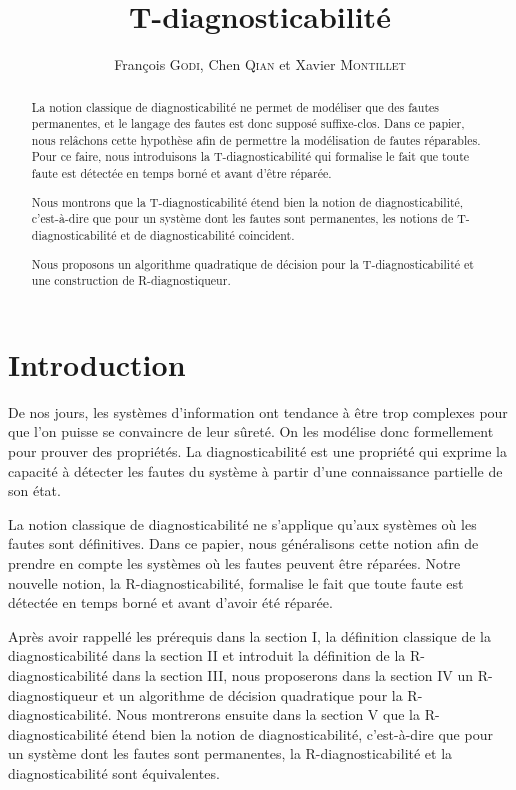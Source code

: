 \documentclass[10pt,a4paper]{article}
\author{Fran\c{c}ois \textsc{Godi}, Chen \textsc{Qian} et Xavier \textsc{Montillet}}
\title{T-diagnosticabilit\'e}
\begin{document}
\maketitle

\begin{abstract}
La notion classique de diagnosticabilit\'e ne permet de mod\'eliser que des fautes permanentes, et le langage des fautes est donc suppos\'e suffixe-clos. Dans ce papier, nous rel\^achons cette hypoth\`ese afin de permettre la mod\'elisation de fautes r\'eparables. Pour ce faire, nous introduisons la T-diagnosticabilit\'e qui formalise le fait que toute faute est d\'etect\'ee en temps born\'e et avant d'\^etre r\'epar\'ee.

Nous montrons que la T-diagnosticabilit\'e \'etend bien la notion de diagnosticabilit\'e, c'est-\`a-dire que pour un syst\`eme dont les fautes sont permanentes, les notions de T-diagnosticabilit\'e et de diagnosticabilit\'e coincident.

Nous proposons un algorithme quadratique de d\'ecision pour la T-diagnosticabilit\'e et une construction de R-diagnostiqueur.
\end{abstract}

\section{Introduction}

De nos jours, les syst\`emes d'information ont tendance \`a \^etre trop complexes pour que l'on puisse se convaincre de leur sûret\'e. On les mod\'elise donc formellement pour prouver des propriétés. La diagnosticabilit\'e est une propri\'et\'e qui exprime la capacit\'e \`a d\'etecter les fautes du syst\`eme \`a partir d'une connaissance partielle de son \'etat.

La notion classique de diagnosticabilit\'e\cite{SamSRST96} ne s'applique qu'aux systèmes où les fautes sont définitives. Dans ce papier, nous généralisons cette notion afin de prendre en compte les systèmes où les fautes peuvent être r\'eparées. Notre nouvelle notion, la R-diagnosticabilit\'e, formalise le fait que toute faute est détectée en temps born\'e et avant d'avoir été r\'epar\'ee.

Après avoir rappellé les prérequis dans la section I, la définition classique de la diagnosticabilité dans la section II et introduit la définition de la R-diagnosticabilit\'e dans la section III, nous proposerons dans la section IV un R-diagnostiqueur et un algorithme de d\'ecision quadratique pour la R-diagnosticabilit\'e. Nous montrerons ensuite dans la section V que la R-diagnosticabilit\'e \'etend bien la notion de diagnosticabilit\'e, c'est-\`a-dire que pour un syst\`eme dont les fautes sont permanentes, la R-diagnosticabilit\'e et la diagnosticabilit\'e sont \'equivalentes.
\end{document}
